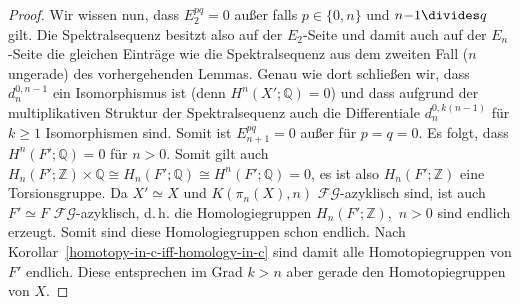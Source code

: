 \documentclass[11pt, a4paper, german]{article}
\theoremstyle{definition}
\theoremstyle{remark}
\newcommand{\Z}{\mathbb{Z}} %
\newcommand{\Q}{\mathbb{Q}} %
\newcommand{\FG}{\mathcal{FG}} %
\renewcommand{\dh}{d.\,h.} %
\begin{document}
\begin{proof}
  Wir wissen nun, dass $E_2^{pq} = 0$ außer falls $p \in \{ 0, n \}$ und $n{-}1 \divides q$ gilt.
  Die Spektralsequenz besitzt also auf der $E_2$-Seite und damit auch auf der $E_n$-Seite die gleichen Einträge wie die Spektralsequenz aus dem zweiten Fall ($n$ ungerade) des vorhergehenden Lemmas.
  Genau wie dort schließen wir, dass $d_n^{0,n-1}$ ein Isomorphismus ist (denn $H^n(X'; \Q) = 0$) und dass aufgrund der multiplikativen Struktur der Spektralsequenz auch die Differentiale $d_n^{0,k(n-1)}$ für $k \geq 1$ Isomorphismen sind.
  Somit ist $E_{n+1}^{pq} = 0$ außer für $p = q = 0$.
  Es folgt, dass $H^n(F'; \Q) = 0$ für $n > 0$.
  Somit gilt auch $H_n(F'; \Z) \times \Q \cong H_n(F'; \Q) \cong H^n(F'; \Q) = 0$, es ist also $H_n(F'; \Z)$ eine Torsionsgruppe.
  Da $X' \simeq X$ und $K(\pi_n(X), n)$ $\FG$-azyklisch sind, ist auch $F' \simeq F$ $\FG$-azyklisch, \dh{} die Homologiegruppen $H_n(F'; \Z)$,~$n > 0$ sind endlich erzeugt.
  Somit sind diese Homologiegruppen schon endlich.
  Nach Korollar~\ref{homotopy-in-c-iff-homology-in-c} sind damit alle Homotopiegruppen von $F'$ endlich.
  Diese entsprechen im Grad $k > n$ aber gerade den Homotopiegruppen von $X$.
\end{proof}
\end{document}
